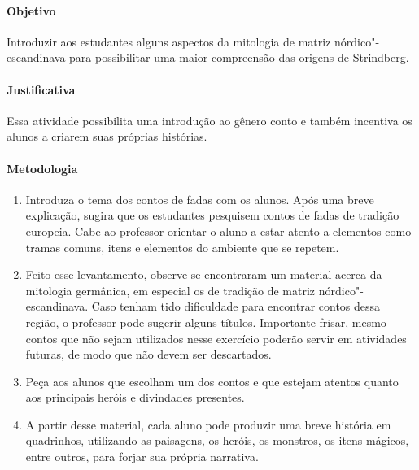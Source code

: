 \documentclass[12pt]{extarticle}
\begin{document}
\paragraph{Objetivo} Introduzir aos estudantes alguns aspectos da mitologia de matriz nórdico"-escandinava para possibilitar uma maior compreensão das origens de Strindberg.

\paragraph{Justificativa} Essa atividade possibilita uma introdução ao gênero conto e também incentiva os alunos a criarem suas próprias histórias.

\paragraph{Metodologia}

\begin{enumerate}

\item Introduza o tema dos contos de fadas com
os alunos. Após uma breve explicação, sugira que os estudantes pesquisem
contos de fadas de tradição europeia. Cabe ao professor orientar o aluno a estar atento a elementos
como tramas comuns, itens e elementos do ambiente que se repetem.

\item Feito esse levantamento, observe se encontraram um material acerca da mitologia germânica, em especial os de tradição de matriz
nórdico"-escandinava. Caso tenham tido dificuldade para encontrar contos
dessa região, o professor pode sugerir alguns títulos. Importante frisar, mesmo contos
que não sejam utilizados nesse exercício poderão servir em atividades
futuras, de modo que não devem ser descartados. 

\item Peça aos alunos que escolham um dos contos e que estejam atentos quanto aos
principais heróis e divindades presentes. 





\item  A partir desse material, cada aluno pode produzir uma breve história em
quadrinhos, utilizando as paisagens, os heróis, os monstros, os itens
mágicos, entre outros, para forjar sua própria narrativa.

\end{enumerate}
\end{document}

